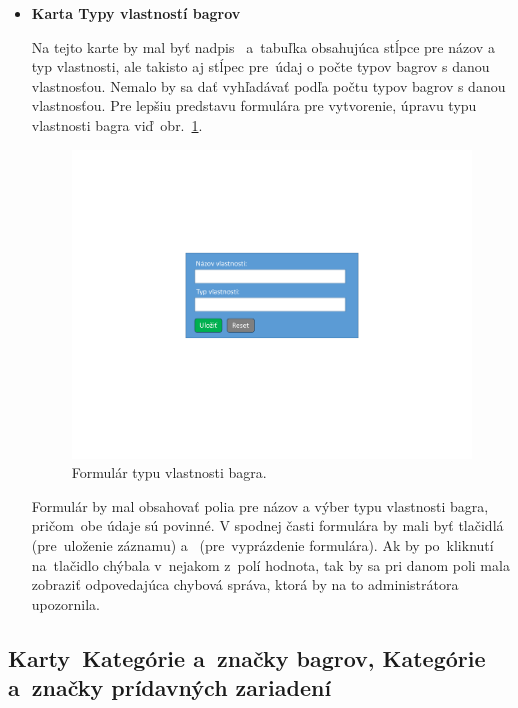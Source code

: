 \begin{itemize}
\item \textbf{Karta Typy vlastností bagrov}

Na tejto karte by mal byť nadpis~ a~tabuľka obsahujúca stĺpce pre názov a typ vlastnosti, ale takisto aj stĺpec pre~údaj o počte typov bagrov s danou vlastnosťou. Nemalo by sa dať vyhľadávať podľa počtu typov bagrov s danou vlastnosťou. Pre lepšiu predstavu formulára pre vytvorenie, úpravu typu vlastnosti bagra viď~obr.~\ref{excavator property type form}.

\begin{figure}[H]\centering
\includegraphics[width=140mm]{../img/UI concept/excavator property type form}
\caption{Formulár typu vlastnosti bagra.}
\label{excavator property type form}
\end{figure}

Formulár by mal obsahovať polia pre názov a výber typu vlastnosti bagra, pričom~obe údaje sú povinné. V spodnej časti formulára by mali byť tlačidlá~ (pre~uloženie záznamu) a~ (pre~vyprázdenie formulára). Ak by po~kliknutí na~tlačidlo  chýbala v~nejakom z~polí hodnota, tak by sa pri danom poli mala zobraziť odpovedajúca chybová správa, ktorá by na to administrátora upozornila.

\end{itemize}

\subsection{Karty~Kategórie a~značky bagrov, Kategórie a~značky prídavných zariadení}


